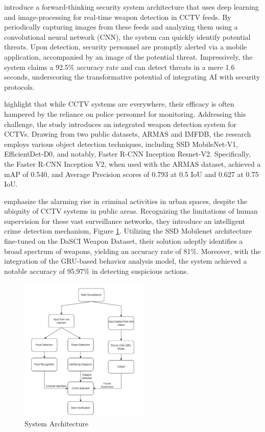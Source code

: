 \citet{rfc19} introduce a forward-thinking security system architecture that uses deep learning and image-processing for real-time weapon detection in CCTV feeds. By periodically capturing images from these feeds and analyzing them using a convolutional neural network (CNN), the system can quickly identify potential threats. Upon detection, security personnel are promptly alerted via a mobile application, accompanied by an image of the potential threat. Impressively, the system claims a 92.5\% accuracy rate and can detect threats in a mere 1.6 seconds, underscoring the transformative potential of integrating AI with security protocols.

\citet{rfc20} highlight that while CCTV systems are everywhere, their efficacy is often hampered by the reliance on police personnel for monitoring. Addressing this challenge, the study introduces an integrated weapon detection system for CCTVs. Drawing from two public datasets, ARMAS and IMFDB, the research employs various object detection techniques, including SSD MobileNet-V1, EfficientDet-D0, and notably, Faster R-CNN Inception Resnet-V2. Specifically, the Faster R-CNN Inception V2, when used with the ARMAS dataset, achieved a mAP of 0.540, and Average Precision scores of 0.793 at 0.5 IoU and 0.627 at 0.75 IoU.

\citet{rfc7} emphasize the alarming rise in criminal activities in urban spaces, despite the ubiquity of CCTV systems in public areas. Recognizing the limitations of human supervision for these vast surveillance networks, they introduce an intelligent crime detection mechanism, Figure \ref{fig:shenoy-architecture}. Utilizing the SSD Mobilenet architecture fine-tuned on the DaSCI Weapon Dataset, their solution adeptly identifies a broad spectrum of weapons, yielding an accuracy rate of 81\%. Moreover, with the integration of the GRU-based behavior analysis model, the system achieved a notable accuracy of 95.97\% in detecting suspicious actions.

\begin{figure}[h]
    \centering 
    \includegraphics[width=0.55\textwidth]{figs/shenoy-architecture.png} 
    \caption{\citet{rfc7} System Architecture}
    \label{fig:shenoy-architecture}
\end{figure}

